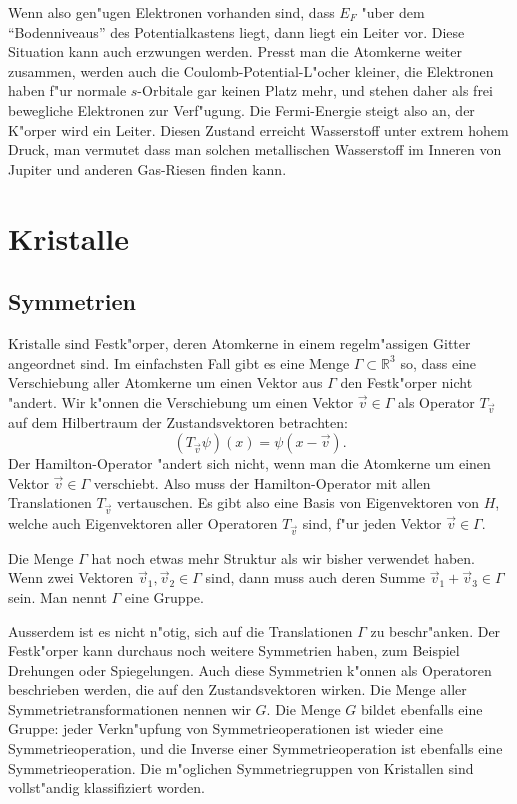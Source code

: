 Wenn also gen"ugen Elektronen vorhanden sind, dass $E_F$ "uber dem
``Bodenniveaus'' des Potentialkastens liegt, dann liegt ein Leiter vor.
Diese Situation kann auch erzwungen werden.
Presst man die Atomkerne weiter zusammen, werden auch die
Coulomb-Potential-L"ocher kleiner, die Elektronen haben f"ur normale
$s$-Orbitale gar keinen Platz mehr, und stehen daher als frei bewegliche
Elektronen zur Verf"ugung.
Die Fermi-Energie steigt also an, der K"orper wird ein Leiter.
Diesen Zustand erreicht Wasserstoff unter extrem hohem Druck,
man vermutet dass man solchen metallischen Wasserstoff im Inneren
von Jupiter und anderen Gas-Riesen finden kann.

\section{Kristalle}
\subsection{Symmetrien}
Kristalle sind Festk"orper, deren Atomkerne in einem regelm"assigen
Gitter angeordnet sind.
Im einfachsten Fall gibt es eine Menge 
$ \Gamma  \subset \mathbb R^3 $
so, dass eine Verschiebung aller Atomkerne um einen Vektor aus $\Gamma$
den Festk"orper nicht "andert.
Wir k"onnen die Verschiebung um einen Vektor $\vec v\in\Gamma$ als
Operator $T_{\vec v}$ auf dem Hilbertraum der Zustandsvektoren
betrachten:
\[
(T_{\vec v}\psi)(x)=\psi(x-\vec v).
\]
Der Hamilton-Operator "andert sich nicht, wenn man die Atomkerne um
einen Vektor $\vec v\in\Gamma$ verschiebt.
Also muss der Hamilton-Operator mit allen Translationen $T_{\vec v}$ 
vertauschen.
Es gibt also eine Basis von Eigenvektoren von $H$, welche auch
Eigenvektoren aller Operatoren $T_{\vec v}$ sind, f"ur jeden Vektor
$\vec v\in\Gamma$.

Die Menge $\Gamma$ hat noch etwas mehr Struktur als wir bisher
verwendet haben.
Wenn zwei Vektoren $\vec v_1,\vec v_2\in\Gamma$ sind, dann muss
auch deren Summe $\vec v_1+\vec v_3\in\Gamma$ sein.
Man nennt $\Gamma$ eine Gruppe.

Ausserdem ist es nicht n"otig, sich auf die Translationen $\Gamma$
zu beschr"anken.
Der Festk"orper kann durchaus noch weitere Symmetrien haben, zum
Beispiel Drehungen oder Spiegelungen.
Auch diese Symmetrien k"onnen als Operatoren beschrieben
werden, die auf den Zustandsvektoren wirken.
Die Menge aller Symmetrietransformationen nennen wir $G$.
Die Menge $G$ bildet ebenfalls eine Gruppe: jeder Verkn"upfung von
Symmetrieoperationen ist wieder eine Symmetrieoperation, und die
Inverse einer Symmetrieoperation ist ebenfalls eine Symmetrieoperation.
Die m"oglichen Symmetriegruppen von Kristallen sind vollst"andig
klassifiziert worden.

